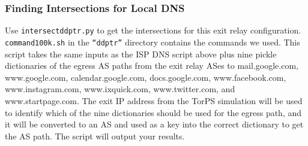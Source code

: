 \documentclass{article}
\begin{document}
\subsubsection{Finding Intersections for Local DNS}
Use {\tt intersect\textunderscore ddptr.py} to get the intersections for this 
exit relay configuration. {\tt command\textunderscore 100k.sh} in the {\tt ``ddptr''} 
directory contains the commands we used. This script takes the same inputs as the ISP 
DNS script above plus nine pickle dictionaries of the egress AS paths from the 
exit relay ASes to mail.google.com, www.google.com, calendar.google.com, 
docs.google.com, www.facebook.com, www.instagram.com, www.ixquick.com, www.twitter.com, 
and www.startpage.com. The exit IP address from the TorPS simulation will be used 
to identify which of the nine dictionaries should be used for the egress path, and 
it will be converted to an AS and used as a key into the correct dictionary to get 
the AS path. The script will output your results.
\end{document}
